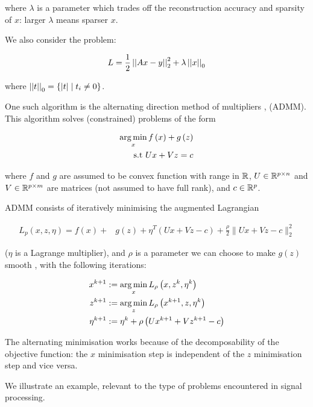 where \(\lambda\) is a parameter which trades off the reconstruction accuracy and sparsity of \(x\): larger \(\lambda\) means sparser \(x\). 

We also consider the problem:

\begin{equation}
L = \frac{1}{2} \left|\left|Ax-y\right|\right|_2^2 + \lambda\left|\left|x\right|\right|_0
\label{LASSO-L0}
\end{equation}

where \( \left|\left|t\right|\right|_0 = \{ |t| \mid t_i \neq 0 \} \).

One such algorithm is the alternating direction method of multipliers \cite{Boyd2010a}, (ADMM). This algorithm solves (constrained) problems of the form

\begin{align}
\operatorname*{arg\,min}_{x} f\left( x \right) + g\left(z\right) \nonumber
\\
\text{s.t } Ux +Vz = c
\label{admm}
\end{align}

where \(f\) and \(g\) are assumed to be convex function with range in \({\mathbb{R}}\), \(U \in {\mathbb{R}}^{p \times n}\) and \(V\in {\mathbb{R}}^{p \times m}\) are matrices (not assumed to have full rank), and \(c \in {\mathbb{R}}^p\).

ADMM consists of iteratively minimising the augmented Lagrangian 

\begin{align*}
L_p\left(x, z, \eta\right) = f\left( x\right) +& g\left(z\right)+\eta^T\left(Ux+Vz-c\right) + \frac{\rho}{2}\|Ux+Vz-c\|_2^2
\label{admm_form}
\end{align*}

(\(\eta\) is a Lagrange multiplier), and \(\rho\) is a parameter we can choose to make \(g(z)\) smooth \cite{nesterov2005smooth}, with the following iterations:

\begin{align}
x^{k+1} &:= \operatorname*{arg\,min}_{x} L_\rho\left(x,z^k,\eta^k\right)\\
z^{k+1} &:= \operatorname*{arg\,min}_{z} L_\rho\left(x^{k+1},z,\eta^k\right)\\
\eta^{k+1} &:= \eta^{k} + \rho \left(Ux^{k+1} + Vz^{k+1} - c\right)
\label{admm_algo}
\end{align}

The alternating minimisation works because of the decomposability of the objective function: the \(x\) minimisation step is independent of the \(z\) minimisation step and vice versa.  

We illustrate an example, relevant to the type of problems encountered in signal processing.

